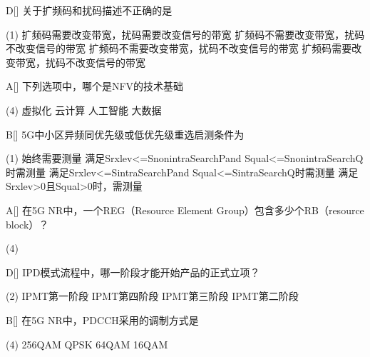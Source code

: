 \begin{choice}{D}[]
    关于扩频码和扰码描述不正确的是
    \begin{tasks}(1)
        \task 扩频码需要改变带宽，扰码需要改变信号的带宽
        \task 扩频码不需要改变带宽，扰码不改变信号的带宽
        \task 扩频码不需要改变带宽，扰码不改变信号的带宽
        \task 扩频码需要改变带宽，扰码不改变信号的带宽
    \end{tasks}
\end{choice}


\begin{choice}{A}[]
    下列选项中，哪个是NFV的技术基础
    \begin{tasks}(4)
        \task 虚拟化
        \task 云计算
        \task 人工智能
        \task 大数据
    \end{tasks}
\end{choice}



\begin{choice}{B}[]
    5G中小区异频同优先级或低优先级重选启测条件为
    \begin{tasks}(1)
        \task 始终需要测量
        \task 满足Srxlev<=SnonintraSearchPand \;Squal<=SnonintraSearchQ时需测量
        \task 满足Srxlev<=SintraSearchPand \;Squal<=SintraSearchQ时需测量
        \task 满足Srxlev>0且Squal>0时，需测量
    \end{tasks}
\end{choice}


\begin{choice}{A}[]
    在5G NR中，一个REG（Resource Element Group）包含多少个RB（resource block）？
    \begin{tasks}(4)
    \end{tasks}
\end{choice}


\begin{choice}{D}[]
    IPD模式流程中，哪一阶段才能开始产品的正式立项？
    \begin{tasks}(2)
        \task IPMT第一阶段
        \task IPMT第四阶段
        \task IPMT第三阶段
        \task IPMT第二阶段
    \end{tasks}
\end{choice}


\begin{choice}{B}[]
    在5G NR中，PDCCH采用的调制方式是

    \begin{tasks}(4)
        \task 256QAM
        \task QPSK
        \task 64QAM
        \task 16QAM
    \end{tasks}
\end{choice}


